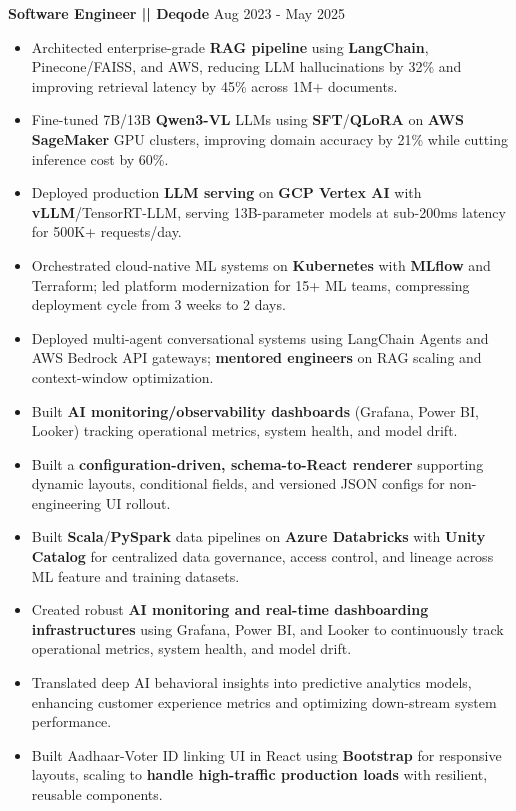 \documentclass[a4paper]{article}
\begin{document}
\vspace{4pt}
\textbf{Software Engineer || Deqode}
\hfill Aug 2023 - May 2025
\begin{itemize}
\vspace{1pt}
\item {Architected enterprise-grade \textbf{RAG pipeline} using \textbf{LangChain}, Pinecone/FAISS, and AWS, reducing LLM hallucinations by 32\% and improving retrieval latency by 45\% across 1M+ documents.}
\item {Fine-tuned 7B/13B \textbf{Qwen3-VL} LLMs using \textbf{SFT}/\textbf{QLoRA} on \textbf{AWS SageMaker} GPU clusters, improving domain accuracy by 21\% while cutting inference cost by 60\%.}
\item {Deployed production \textbf{LLM serving} on \textbf{GCP Vertex AI} with \textbf{vLLM}/TensorRT-LLM, serving 13B-parameter models at sub-200ms latency for 500K+ requests/day.}
\item {Orchestrated cloud-native ML systems on \textbf{Kubernetes} with \textbf{MLflow} and Terraform; led platform modernization for 15+ ML teams, compressing deployment cycle from 3 weeks to 2 days.}
\item {Deployed multi-agent conversational systems using LangChain Agents and AWS Bedrock API gateways; \textbf{mentored engineers} on RAG scaling and context-window optimization.}
\item {Built \textbf{AI monitoring/observability dashboards} (Grafana, Power BI, Looker) tracking operational metrics, system health, and model drift.}
\item {Built a \textbf{configuration-driven, schema-to-React renderer} supporting dynamic layouts, conditional fields, and versioned JSON configs for non-engineering UI rollout.}
\item {Built \textbf{Scala}/\textbf{PySpark} data pipelines on \textbf{Azure Databricks} with \textbf{Unity Catalog} for centralized data governance, access control, and lineage across ML feature and training datasets.}
\item {Created robust \textbf{AI monitoring and real-time dashboarding infrastructures} using Grafana, Power BI, and Looker to continuously track operational metrics, system health, and model drift.}
\item {Translated deep AI behavioral insights into predictive analytics models, enhancing customer experience metrics and optimizing down-stream system performance.}
\item {Built Aadhaar-Voter ID linking UI in React using \textbf{Bootstrap} for responsive layouts, scaling to \textbf{handle high-traffic production loads} with resilient, reusable components.}

\end{itemize}
\end{document}
